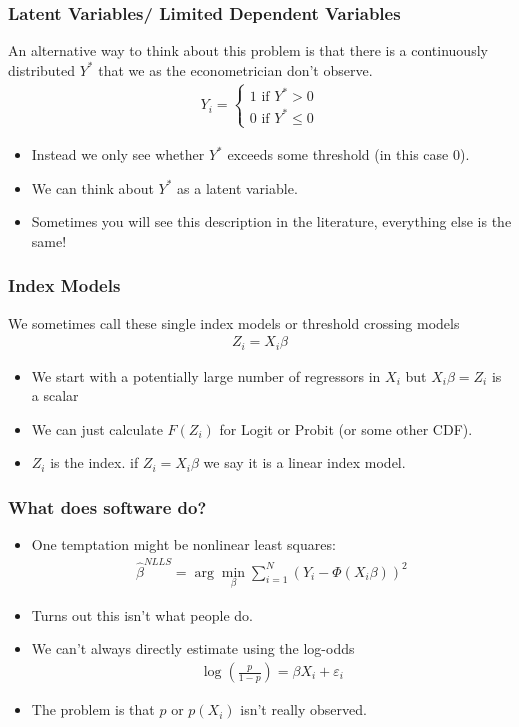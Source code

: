 \documentclass[aspectratio=169]{beamer}
\begin{document}
\begin{frame}
\frametitle{Latent Variables/ Limited Dependent Variables}
An alternative way to think about this problem is that there is a continuously distributed $Y^{*}$ that we as the econometrician don't observe.
\begin{eqnarray*}
Y_i =
\begin{cases}
1 \mbox{ if } Y^{*} >0 \\
0 \mbox{ if } Y^{*} \leq 0
\end{cases}
\end{eqnarray*}
\begin{itemize}
\item Instead we only see whether $Y^{*}$ exceeds some threshold (in this case $0$).
\item We can think about $Y^{*}$ as a \alert{latent variable}.
\item Sometimes you will see this description in the literature, everything else is the same!
\end{itemize}
\end{frame}


\begin{frame}
\frametitle{Index Models}
We sometimes call these single index models or threshold crossing models
\begin{eqnarray*}
Z_i = X_i \beta
\end{eqnarray*}
\begin{itemize}
\item We start with a potentially large number of regressors in $X_i$ but $X_i \beta = Z_i$ is a \alert{scalar}
\item We can just calculate $F(Z_i)$ for Logit or Probit (or some other CDF).
\item $Z_i$ is the \alert{index}. if $Z_i = X_i \beta$ we say it is a \alert{linear index} model.
\end{itemize}
\end{frame}




\begin{frame}
\frametitle{What does software do?}
\begin{itemize}
\item One temptation might be \alert{nonlinear least squares}:
\begin{eqnarray*}
\hat{\beta}^{NLLS} = \arg \min_{\beta} \sum_{i=1}^N (Y_i - \Phi(X_i \beta))^2
\end{eqnarray*}
\item Turns out this isn't what people do.
\item We can't always directly estimate using the log-odds
\begin{eqnarray*}
\log\left(\frac{p}{1-p}\right)= \beta X_i + \varepsilon_i
\end{eqnarray*}
\item The problem is that $p$ or $p(X_i)$ isn't really observed.
\end{itemize}
\end{frame}
\end{document}
